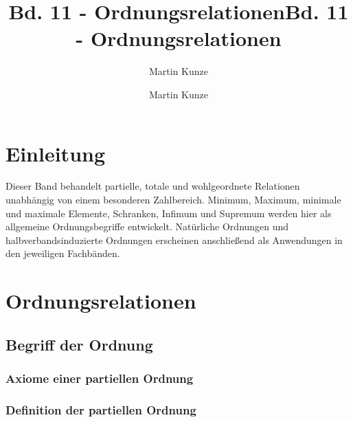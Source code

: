 \documentclass[main.tex]{subfiles}
\title{Bd. 11 - Ordnungsrelationen}
\author{Martin Kunze}
\date{}
\begin{document}
\title{Bd. 11 - Ordnungsrelationen}
\author{Martin Kunze}
\date{}
\hypersetup{pageanchor=false}
\maketitle
\hypersetup{pageanchor=true}
\setcounter{tocdepth}{3}
\tableofcontents
\setcounter{file}{11}
\renewcommand{\FormulaBandID}{11}

\chapter{Einleitung}

Dieser Band behandelt partielle, totale und wohlgeordnete Relationen
unabhängig von einem besonderen Zahlbereich. Minimum, Maximum, minimale und
maximale Elemente, Schranken, Infimum und Supremum werden hier als allgemeine
Ordnungsbegriffe entwickelt. Natürliche Ordnungen und
halbverbandsinduzierte Ordnungen erscheinen anschließend als Anwendungen in
den jeweiligen Fachbänden.

\chapter{Ordnungsrelationen}

\section{Begriff der Ordnung}

\subsection{Axiome einer partiellen Ordnung}


\subsection{Definition der partiellen Ordnung}

\end{document}
